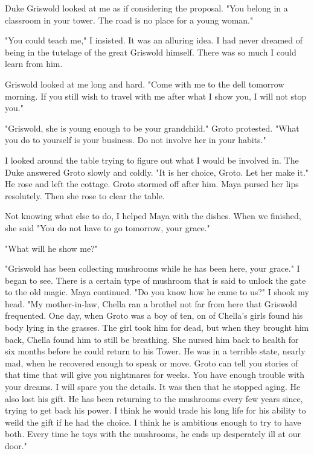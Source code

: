 \documentclass{article}
\begin{document}
Duke Griswold looked at me as if considering the proposal. "You belong in a classroom in your tower. The road is no place for a young woman."

"You could teach me," I insisted. It was an alluring idea. I had never dreamed of being in the tutelage of the great Griswold himself. There was so much I could learn from him. 

Griswold looked at me long and hard. "Come with me to the dell tomorrow morning. If you still wish to travel with me after what I show you, I will not stop you."

"Griswold, she is young enough to be your grandchild." Groto protested. "What you do to yourself is your business. Do not involve her in your habits."

I looked around the table trying to figure out what I would be involved in. The Duke answered Groto slowly and coldly. "It is her choice, Groto. Let her make it." He rose and left the cottage. Groto stormed off after him. Maya pursed her lips resolutely. Then she rose to clear the table.

Not knowing what else to do, I helped Maya with the dishes. When we finished, she said "You do not have to go tomorrow, your grace."

"What will he show me?"

"Griswold has been collecting mushrooms while he has been here, your grace." I began to see. There is a certain type of mushroom that is said to unlock the gate to the old magic. Maya continued. "Do you know how he came to us?" I shook my head. "My mother-in-law, Chella ran a brothel not far from here that Griswold frequented. One day, when Groto was a boy of ten, on of Chella's girls found his body lying in the grasses. The girl took him for dead, but when they brought him back, Chella found him to still be breathing. She nursed him back to health for six months before he could return to his Tower. He was in a terrible state, nearly mad, when he recovered enough to speak or move. Groto can tell you stories of that time that will give you nightmares for weeks. You have enough trouble with your dreams. I will spare you the details. It was then that he stopped aging. He also lost his gift. He has been returning to the mushrooms every few years since, trying to get back his power. I think he would trade his long life for his ability to weild the gift if he had the choice. I think he is ambitious enough to try to have both. Every time he toys with the mushrooms, he ends up desperately ill at our door."
\end{document}

